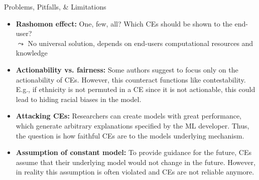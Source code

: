 \documentclass[11pt,compress,t,notes=noshow, aspectratio=169, xcolor=table]{beamer}
\begin{document}
\begin{frame}{Problems, Pitfalls, \& Limitations}
\begin{itemize}[<+->]
    \item \textbf{Rashomon effect:} One, few, all? Which CEs should be shown to the end-user?\\
    $\leadsto$ No universal solution, depends on end-users computational resources and knowledge
    \item \textbf{Actionability vs. fairness:} Some authors suggest to focus only on the actionability of CEs. However, this counteract functions like contestability. E.g., if ethnicity is not permuted in a CE since it is not actionable, this could lead to hiding racial biases in the model.
    \item \textbf{Attacking CEs:} Researchers can create models with great performance, which generate arbitrary explanations specified by the ML developer. Thus, the question is how faithful CEs are to the models underlying mechanism.
    \item \textbf{Assumption of constant model:} To provide guidance for the future, CEs assume that their underlying model would not change in the future. However, in reality this assumption is often violated and CEs are not reliable anymore. 
\end{itemize}

\end{frame}

\endlecture
\end{document}
